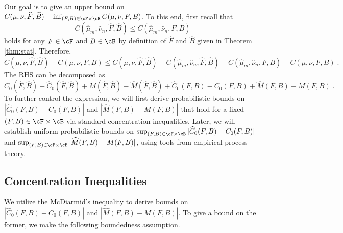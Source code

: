 \documentclass[11pt]{article}
\begin{document}
Our goal is to give an upper bound on $C(\mu, \nu, \widehat{F}, \widehat{B}) - \inf_{(F, B) \in \cF \times \cB} C(\mu, \nu, F, B) $. To this end, first recall that
\begin{equation*}
	C(\widehat{\mu}_m, \widehat{\nu}_n, \widehat{F}, \widehat{B}) \le C(\widehat{\mu}_m, \widehat{\nu}_n, F, B)
\end{equation*}
holds for any $F \in \cF$ and $B \in \cB$ by definition of $\widehat{F}$ and $\widehat{B}$ given in Theorem \ref{thm:stat}. Therefore,
\begin{equation*}
	C(\mu, \nu, \widehat{F}, \widehat{B}) - C(\mu, \nu, F, B)
	\le C(\mu, \nu, \widehat{F}, \widehat{B}) - C(\widehat{\mu}_m, \widehat{\nu}_n, \widehat{F}, \widehat{B}) + C(\widehat{\mu}_m, \widehat{\nu}_n, F, B) - C(\mu, \nu, F, B)\;.
\end{equation*}
The RHS can be decomposed as
\begin{equation*}
	C_0(\widehat{F}, \widehat{B}) - \widehat{C}_0(\widehat{F}, \widehat{B}) + M(\widehat{F}, \widehat{B}) - \widehat{M}(\widehat{F}, \widehat{B}) + \widehat{C}_0(F, B) - C_0(F, B) + \widehat{M}(F, B) - M(F, B)\;.
\end{equation*}
To further control the expression, we will first derive probabilistic bounds on $|\widehat{C}_0(F, B) - C_0(F, B)|$ and $|\widehat{M}(F, B) - M(F, B)|$ that hold for a fixed $(F, B) \in \cF \times \cB$ via standard concentration inequalities. Later, we will establish uniform probabilistic bounds on $\sup_{(F,B) \in \cF \times \cB} |\widehat{C}_0(F, B) - C_0(F, B)|$ and $\sup_{(F,B) \in \cF \times \cB} |\widehat{M}(F, B) - M(F, B)|$, using tools from empirical process theory.

\subsection{Concentration Inequalities}
We utilize the McDiarmid's inequality to derive bounds on $|\widehat{C}_0(F, B) - C_0(F, B)|$ and $|\widehat{M}(F, B) - M(F, B)|$. To give a bound on the former, we make the following boundedness assumption. 
\end{document}
